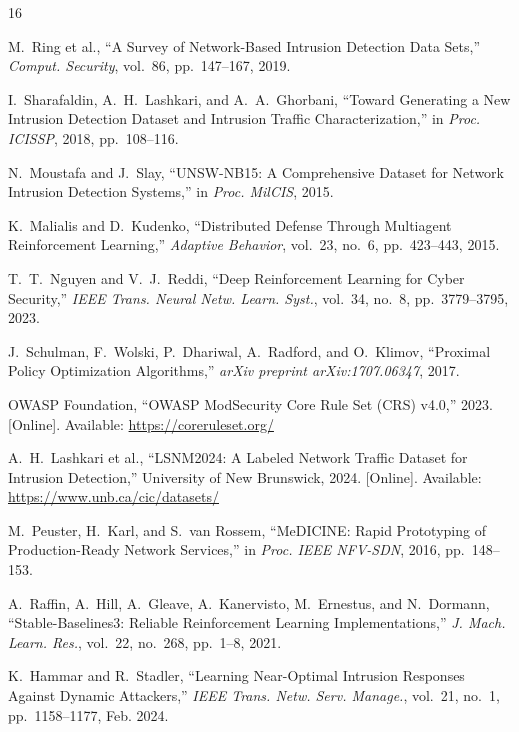\documentclass[conference]{IEEEtran}
\begin{document}

\begin{thebibliography}{16}


M.~Ring et al.,
``A Survey of Network-Based Intrusion Detection Data Sets,''
\emph{Comput. Security}, vol.~86, pp.~147--167, 2019.

I.~Sharafaldin, A.~H.~Lashkari, and A.~A.~Ghorbani,
``Toward Generating a New Intrusion Detection Dataset and Intrusion
Traffic Characterization,''
in \emph{Proc. ICISSP}, 2018, pp.~108--116.

N.~Moustafa and J.~Slay,
``UNSW-NB15: A Comprehensive Dataset for Network Intrusion Detection
Systems,''
in \emph{Proc. MilCIS}, 2015.

K.~Malialis and D.~Kudenko,
``Distributed Defense Through Multiagent Reinforcement Learning,''
\emph{Adaptive Behavior}, vol.~23, no.~6, pp.~423--443, 2015.

T.~T.~Nguyen and V.~J.~Reddi,
``Deep Reinforcement Learning for Cyber Security,''
\emph{IEEE Trans. Neural Netw. Learn. Syst.}, vol.~34, no.~8,
pp.~3779--3795, 2023.

J.~Schulman, F.~Wolski, P.~Dhariwal, A.~Radford, and O.~Klimov,
``Proximal Policy Optimization Algorithms,''
\emph{arXiv preprint arXiv:1707.06347}, 2017.

OWASP Foundation,
``OWASP ModSecurity Core Rule Set (CRS) v4.0,'' 2023.
[Online]. Available: \url{https://coreruleset.org/}

A.~H.~Lashkari et al.,
``LSNM2024: A Labeled Network Traffic Dataset for Intrusion Detection,''
University of New Brunswick, 2024.
[Online]. Available: \url{https://www.unb.ca/cic/datasets/}

M.~Peuster, H.~Karl, and S.~van Rossem,
``MeDICINE: Rapid Prototyping of Production-Ready Network Services,''
in \emph{Proc. IEEE NFV-SDN}, 2016, pp.~148--153.

A.~Raffin, A.~Hill, A.~Gleave, A.~Kanervisto, M.~Ernestus, and
N.~Dormann,
``Stable-Baselines3: Reliable Reinforcement Learning Implementations,''
\emph{J. Mach. Learn. Res.}, vol.~22, no.~268, pp.~1--8, 2021.

K.~Hammar and R.~Stadler,
``Learning Near-Optimal Intrusion Responses Against Dynamic Attackers,''
\emph{IEEE Trans. Netw. Serv. Manage.}, vol.~21, no.~1,
pp.~1158--1177, Feb. 2024.


\end{thebibliography}
\end{document}
